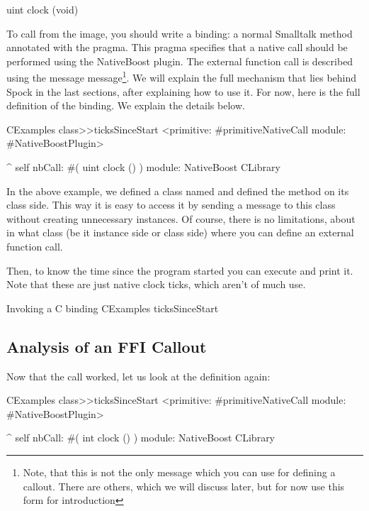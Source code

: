 \documentclass[a4paper,10pt,twoside]{book}
\begin{document}
\begin{code}{}
uint clock (void)
\end{code}

To call  from the image, you should write a binding: a normal Smalltalk method annotated with the  pragma. This pragma specifies that a native call should be performed using the NativeBoost plugin.  The external function call is described using the message  message\footnote{Note, that this is not the only message which you can use for defining a callout. There are others, which we will discuss later, but for now use this form for introduction}. We will explain the full mechanism that lies behind Spock in the last sections, after explaining how to use it. For now, here is the full definition of the binding. We explain the details below.

\begin{code}{}
CExamples class>>ticksSinceStart
	<primitive: #primitiveNativeCall module: #NativeBoostPlugin>
	
	^ self nbCall: #( uint clock () ) module: NativeBoost CLibrary
\end{code}

In the above example, we defined a class named  and defined the method on its class side. This way it is easy to access it by sending a message to this class without creating unnecessary instances. Of course, there is no limitations, about in what class (be it instance side or class side) where you can define an external function call.

Then, to know the time since the program started you can execute and print it.
Note that these are just native clock ticks, which aren't of much use. 
\begin{script}{Invoking a C binding}
CExamples ticksSinceStart
\end{script}


\subsection{Analysis of an FFI Callout}
Now that the call worked, let us look at the definition again:

\begin{code}{}
CExamples class>>ticksSinceStart
	<primitive: #primitiveNativeCall module: #NativeBoostPlugin>
	
	^ self nbCall: #( int clock () ) module: NativeBoost CLibrary
\end{code}
\end{document}
